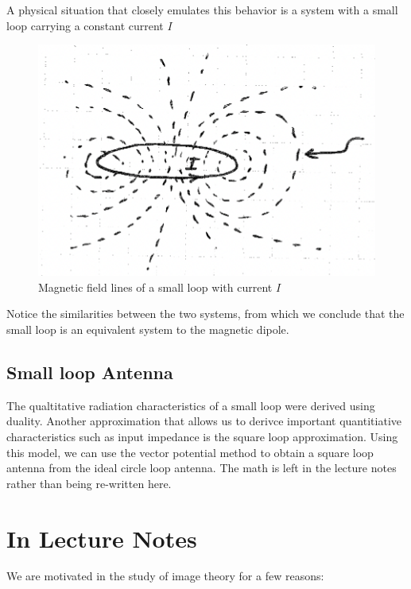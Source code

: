 \documentclass{article}
\begin{document}
A physical situation that closely emulates this behavior is a system with a small loop carrying a constant current $I$

\begin{figure}[H]
  \centering
     \includegraphics[scale=0.8]{Course Notes/images/8.5.png}
  \caption{Magnetic field lines of a small loop with current $I$}
\end{figure}

Notice the similarities between the two systems, from which we conclude that the small loop is an equivalent system to the magnetic dipole.

\subsection{Small loop Antenna}

The qualtitative radiation characteristics of a small loop were derived using duality. Another approximation that allows us to derivce important quantitiative characteristics such as input impedance is the square loop approximation. Using this model, we can use the vector potential method to obtain a square loop antenna from the ideal circle loop antenna. The math is left in the lecture notes rather than being re-written here.

\section{In Lecture Notes}

We are motivated in the study of image theory for a few reasons:
\end{document}
